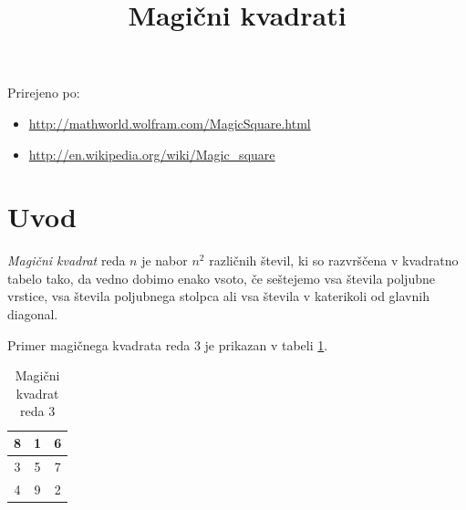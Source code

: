 \documentclass[a4paper,12pt]{article}
\title{Magični kvadrati}
\date{}
\begin{document}
\maketitle

Prirejeno po:

\begin{itemize}
   \item \url{http://mathworld.wolfram.com/MagicSquare.html}
   \item \url{http://en.wikipedia.org/wiki/Magic_square}
\end{itemize}

\tableofcontents


\newpage

\section{Uvod}

\begin{Definicija}
   \emph{Magični kvadrat} reda \(n\) je nabor \(n^2\) različnih števil,
   ki so razvrščena v kvadratno tabelo tako, da vedno dobimo enako vsoto,
   če seštejemo vsa števila poljubne vrstice, vsa števila poljubnega
   stolpca ali vsa števila v katerikoli od glavnih diagonal.
\end{Definicija}

Primer magičnega kvadrata reda 3 je prikazan v tabeli \ref{table:mag3}.

\begin{table}[!ht]
\centering
\caption{Magični kvadrat reda 3}
\label{table:mag3}
\large
   \begin {tabular}{|c|c|c|} \toprule
   8 & 1 & 6 \\ \hline
   3 & 5 & 7 \\ \hline
   4 & 9 & 2 \\ \bottomrule
\end{tabular}
\normalsize
\end{table}
\end{document}
